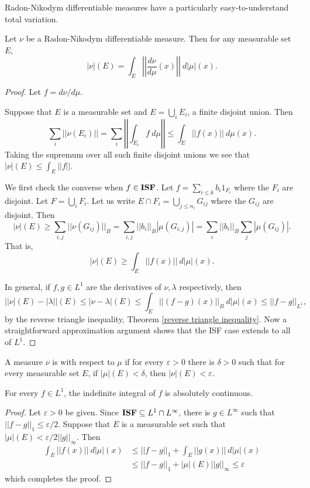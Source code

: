 Radon-Nikodym differentiable measures have a particularly easy-to-understand total variation.
\begin{theorem}
Let $\nu$ be a Radon-Nikodym differentiable measure. Then for any measurable set $E$,
$$|\nu|(E) = \int_E \left|\left|\frac{d\nu}{d\mu}(x)\right|\right|~d|\mu|(x).$$
\end{theorem}
\begin{proof}
Let $f = d\nu/d\mu$.

Suppose that $E$ is a measurable set and $E = \bigcup_i E_i$, a finite disjoint union. Then
$$\sum_i ||\nu(E_i)|| = \sum_i \left|\left| \int_{E_i} f~d\mu\right|\right| \leq \int_E ||f(x)||~d\mu(x).$$
Taking the supremum over all such finite disjoint unions we see that $|\nu|(E) \leq \int_E ||f||$.

We first check the converse when $f \in \mathbf{ISF}$. Let $f = \sum_{i \leq k} b_i 1_{F_i}$ where the $F_i$ are disjoint.
Let $F = \bigcup_i F_i$.
Let us write $E \cap F_i = \bigcup_{j \leq n_i} G_{ij}$ where the $G_{ij}$ are disjoint. Then
$$|\nu|(E) \geq \sum_{i,j} ||\nu(G_{ij})||_B = \sum_{i,j} ||b_i||_B |\mu(G_{i,j})| = \sum_i ||b_i||_B \sum_j |\mu(G_{ij})|.$$
That is,
$$|\nu|(E) \geq \int_E ||f(x)|| ~d|\mu|(x).$$

In general, if $f,g \in L^1$ are the derivatives of $\nu,\lambda$ respectively, then
$$||\nu|(E) - |\lambda||(E) \leq |\nu - \lambda|(E) \leq \int_E ||(f - g)(x)||_B ~d|\mu|(x) \leq ||f - g||_{L^1},$$
by the reverse triangle inequality, Theorem \ref{reverse triangle inequality}.
Now a straightforward approximation argument shows that the ISF case extends to all of $L^1$.
\end{proof}

\begin{definition}
A measure $\nu$ is  with respect to $\mu$ if for every $\varepsilon > 0$ there is $\delta > 0$ such that for every measurable set $E$, if $|\mu|(E) < \delta$, then $|\nu|(E) < \varepsilon$.
\end{definition}

\begin{theorem}
\label{indefinite integral is abs cts}
For every $f \in L^1$, the indefinite integral of $f$ is absolutely continuous.
\end{theorem}
\begin{proof}
Let $\varepsilon > 0$ be given.
Since $\mathbf{ISF} \subseteq L^1 \cap L^\infty$, there is $g \in L^\infty$ such that $||f - g||_1 \leq \varepsilon/2$.
Suppose that $E$ is a measurable set such that $|\mu|(E) < \varepsilon/2||g||_\infty$. Then
\begin{align*}
\int_E ||f(x)|| ~d|\mu|(x) &\leq ||f - g||_1 + \int_E ||g(x)|| ~d|\mu|(x) \\
&\leq ||f - g||_1 + |\mu|(E)||g||_\infty \leq \varepsilon
\end{align*}
which completes the proof.
\end{proof}

